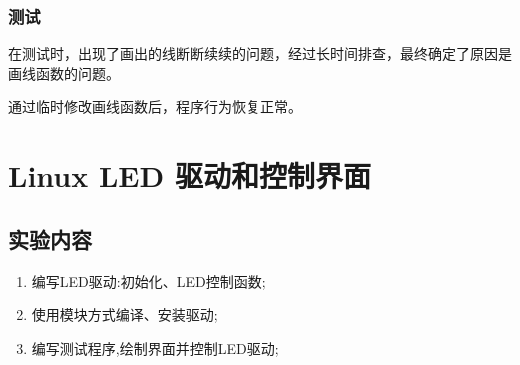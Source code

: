 \documentclass{report}
\begin{document}
\subsection{测试}
\par 在测试时，出现了画出的线断断续续的问题，经过长时间排查，最终确定了原因是画线函数的问题。
\par 通过临时修改画线函数后，程序行为恢复正常。


\chapter{Linux LED 驱动和控制界面}
\section{实验内容}

\begin{enumerate}
    \item 编写LED驱动:初始化、LED控制函数;
    \item 使用模块方式编译、安装驱动;
    \item 编写测试程序,绘制界面并控制LED驱动;
\end{enumerate}
\end{document}
